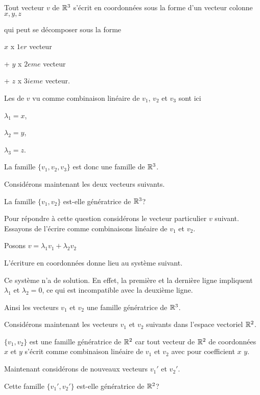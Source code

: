 \change
Tout vecteur $v$ de $\mathbb{R}^3$ s'écrit en coordonnées sous la forme d'un vecteur colonne $x,y,z$

\change
qui peut se décomposer sous la forme 

\change
$x$ x $1er$ vecteur 

\change
+ $y$ x $2eme$ vecteur 

\change
+ $z$ x $3ieme$ vecteur.

Les  de $v$ vu comme combinaison linéaire de $v_1$, $v_2$ et $v_3$ sont ici 

\change
$\lambda_1=x$, 

\change
$\lambda_2=y$, 

\change
$\lambda_3=z$.

\change 
La famille $\{v_1,v_2,v_3\}$ est donc une famille  de $\mathbb{R}^3$.
\diapo

Considérons maintenant les deux vecteurs suivants.

\change
La famille $\{v_1, v_2\}$ est-elle génératrice de $\mathbb{R}^3$?

\change
Pour répondre à cette question considérons le vecteur particulier $v$ suivant. Essayons de l'écrire comme combinaisons linéaire de $v_1$ et $v_2$.

\change
Posons $v= \lambda_1 v_1 + \lambda_2 v_2$

\change
L'écriture en coordonnées donne lieu au système suivant.

\change
Ce système n'a  de solution. En effet, la première et la dernière ligne 
impliquent $\lambda_1$ et $\lambda_2=0$, ce qui est incompatible avec la deuxième ligne.

\change
Ainsi les vecteurs $v_1$ et $v_2$  une famille génératrice de $\mathbb{R}^3$.

\diapo
Considérons maintenant les vecteurs $v_1$ et $v_2$ suivants dans l'espace vectoriel $\mathbb{R}^2$.


\change
 $\{v_1, v_2\}$ est une famille génératrice de $\mathbb{R}^2$ car tout vecteur de $\mathbb{R}^2$ de coordonnées $x$ et $y$ s'écrit comme combinaison linéaire de $v_1$ et $v_2$ avec pour coefficient $x$ $y$.


\change
Maintenant considérons de nouveaux vecteurs $v_1'$ et $v_2'$.

\change
Cette famille $\{v_1', v_2'\}$ est-elle génératrice de $\mathbb{R}^2$?
  
